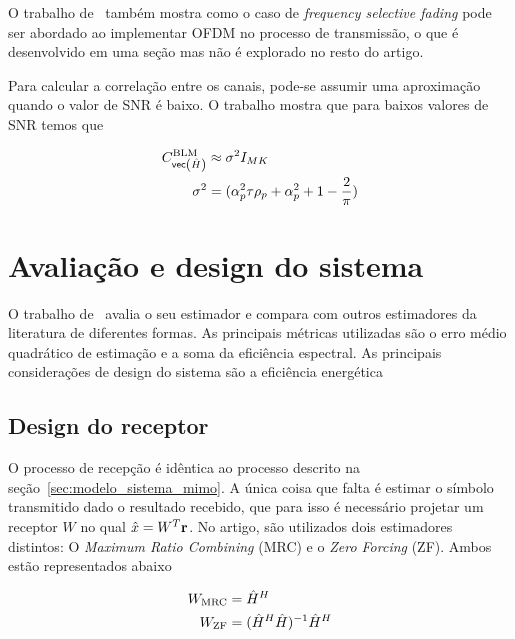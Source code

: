 \documentclass{article}
\begin{document}
	O trabalho de~\cite{li.etal_2017a} também mostra como o caso de \textit{frequency selective fading} pode ser abordado ao implementar OFDM no processo de transmissão, o que é desenvolvido em uma seção mas não é explorado no resto do artigo.

	Para calcular a correlação entre os canais, pode-se assumir uma aproximação quando o valor de SNR é baixo. O trabalho mostra que para baixos valores de SNR temos que
	
	\begin{equation}
		\begin{split}
			C_{ \mathsf{vec} \left( \hat{H} \right) }^{\text{BLM}} & \approx\sigma^2I_{MK} \\ 
			\sigma^2 & = (\alpha_p^2\tau\rho_p+\alpha^2_p+1-\frac{2}{\pi})
		\end{split}
		\label{eq:aproximacao_covariancia_canal_baixo_snr}
	\end{equation}

	\section{Avaliação e design do sistema}
	\label{sec:metricas_avaliacao}

	O trabalho de~\cite{li.etal_2017a} avalia o seu estimador e compara com outros estimadores da literatura de diferentes formas. As principais métricas utilizadas são o erro médio quadrático de estimação e a soma da eficiência espectral. As principais considerações de design do sistema são a eficiência energética 

	\subsection{Design do receptor}

	O processo de recepção é idêntica ao processo descrito na seção~\ref{sec:modelo_sistema_mimo}. A única coisa que falta é estimar o símbolo transmitido dado o resultado recebido, que para isso é necessário projetar um receptor $W$ no qual $\hat{x}=W^T\mathbf{r}$. No artigo, são utilizados dois estimadores distintos: O \textit{Maximum Ratio Combining} (MRC) e o \textit{Zero Forcing} (ZF). Ambos estão representados abaixo
	
	\begin{equation}
		\begin{split}
			W_{\text{MRC}} & = \hat{H}^H\\ 
			W_{\text{ZF}}  & = (\hat{H}^H\hat{H})^{-1}\hat{H}^H
		\end{split}
		\label{eq:}
	\end{equation}
\end{document}
